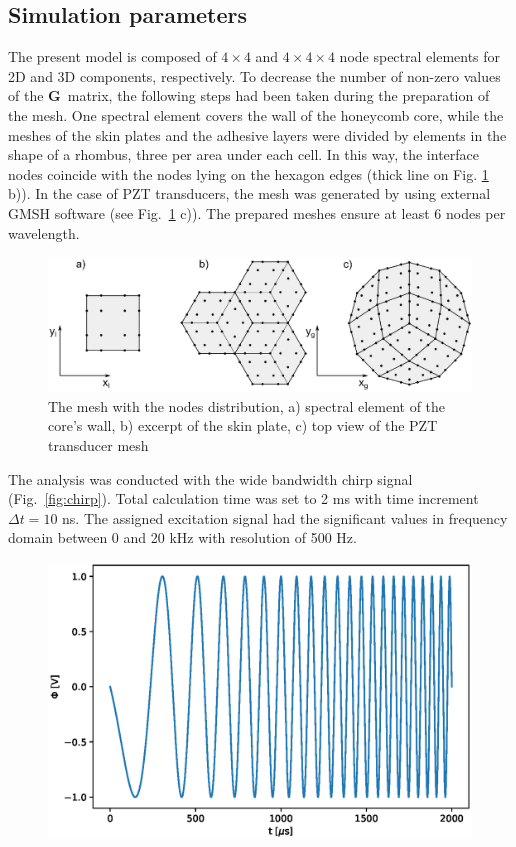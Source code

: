 \documentclass[materials,article,submit,moreauthors,pdftex]{Definitions/mdpi}
\begin{document}
{\subsection{Simulation parameters}
\label{sec:simulation}
The present model is composed of \(4 \times 4\) and \(4 \times 4 \times 4\) node spectral elements for 2D and 3D components, respectively.
To decrease the number of non-zero values of the \(\textbf{G}\)~matrix, the following steps had been taken during the preparation of the mesh.
One spectral element covers the wall of the honeycomb core, while the meshes of the skin plates and the adhesive layers were divided by elements in the shape of a rhombus, three per area under each cell.
In this way, the interface nodes coincide with the nodes lying on the hexagon edges (thick line on Fig. \ref{fig:skin_mesh} b)).
In the case of PZT transducers, the mesh was generated by using external GMSH software \cite{geuzaine2009gmsh} (see Fig.~\ref{fig:skin_mesh} c)).
The prepared meshes ensure at least 6 nodes per wavelength.
\begin{figure}
	\begin{center}
		\includegraphics[width=1\linewidth]{../../figures/eps/skin_mesh.eps}
	\end{center}
	\caption{The mesh with the nodes distribution, a) spectral element of the core's wall, b) excerpt of the skin plate, c) top view of the PZT transducer mesh}
	\label{fig:skin_mesh}
\end{figure}
The analysis was conducted with the wide bandwidth chirp signal (Fig.~\ref{fig:chirp}).
Total calculation time was set to 2 ms with time increment \(\Delta t=10\) ns.
The assigned excitation signal had the significant values in frequency domain between 0 and 20 kHz with resolution of 500 Hz.
\begin{figure}
	\begin{center}
		\includegraphics[width=1\linewidth]{../../figures/eps/chirp_0_20.eps}

\end{center}
\end{figure}}
\end{document}
